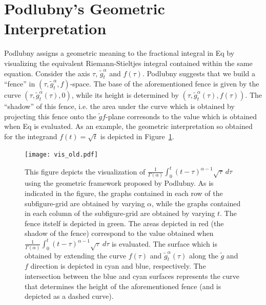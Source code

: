\documentclass[twoside,reqno,11pt]{fcaa-var} %
\begin{document}
\section{Podlubny's Geometric Interpretation}
Podlubny assigns a geometric meaning to the fractional integral in Eq by visualizing the equivalent Riemann-Stieltjes integral contained within the same equation. Consider the axis $\tau$, $\widetilde{g}_t^{\alpha}$ and $f(\tau)$. Podlubny suggests that we build a ``fence'' in $(\tau,\widetilde{g}_t^{\alpha},f)$-space. The base of the aforementioned fence is given by the curve $(\tau,\widetilde{g}_t^{\alpha}(\tau),0)$, while its height is determined by $(\tau,\widetilde{g}_t^{\alpha}(\tau),f(\tau))$. The ``shadow'' of this fence, i.e. the area under the curve which is obtained by projecting this fence onto the $\widetilde{g}f$-plane corresonds to the value which is obtained when Eq is evaluated. As an example, the geometric interpretation so obtained for the integrand $f(t)=\sqrt{t}$ is depicted in Figure~\ref{}.



\begin{figure}[htb]
\centering
\texttt{[image: vis\_old.pdf]}
\caption{This figure depicts the visualization of $\frac{1}{\Gamma(\alpha)}\int_{0}^{t}(t-\tau)^{\alpha-1}\sqrt{\tau}~d\tau$ using the geometric framework proposed by Podlubny.
As is indicated in the figure, the graphs contained in each row of the subfigure-grid are obtained by varying $\alpha$, while the graphs contained in each column of the subfigure-grid are obtained by varying $t$. The fence itstelf is depicted in green. The areas depicted in red (the shadow of the fence) correspond to the value obtained when $\frac{1}{\Gamma(\alpha)}\int_{0}^{t}(t-\tau)^{\alpha-1}\sqrt{\tau}~d\tau$ is evaluated.  The surface which is obtained by extending the curve $f(\tau)$ and $\widetilde{g}_t^{\alpha}(\tau)$ along the $\widetilde{g}$ and $f$ direction is depicted in cyan and blue, respectively. The intersection between the blue and cyan 
surfaces represents the curve that determines the height of the aforementioned fence (and is depicted as a dashed curve).   
}
\label{fig:gandh}
\end{figure}
\end{document}
